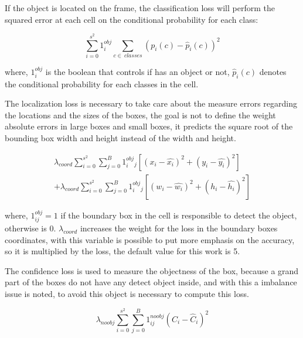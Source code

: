 If the object is located on the frame, the classification loss will perform the squared error at each cell on the conditional probability for each class: 

\begin{equation}
\label{eq:classification_loss}
    \sum_{i=0}^{s^2}1^{obj}_i \sum_{c\in~classes} \left ( p_i\left ( c \right )-\hat{p}_i\left ( c \right )\right )^2
\end{equation}

where, $1^{obj}_i$ is the boolean that controls if has an object or not, $\hat{p}_i\left ( c \right )$ denotes the conditional probability for each classes in the cell.

The localization loss is necessary to take care about the measure errors regarding the locations and the sizes of the boxes, the goal is not to define the weight absolute errors in large boxes and small boxes, it predicts the square root of the bounding box width and height instead of the width and height. 

\begin{equation}
\label{eq:localization_loss}
\begin{aligned}
    \lambda_{coord}\sum_{i=0}^{s^2}\sum_{j=0}^{B}1^{obj}_i_j\left [ \left ( x_i - \hat{x_i} \right )^2  + (y_i-\hat{y_i})^2 \right ] \\ 
    + \lambda_{coord}\sum_{i=0}^{s^2}\sum_{j=0}^{B}1^{obj}_i_j\left [ \left ( w_i - \hat{w_i} \right )^2  + (h_i-\hat{h_i})^2 \right ] 
    \end{aligned}
\end{equation}

where, $1_{ij}^{obj} = 1$ if the boundary box in the cell is responsible to detect the object, otherwise is 0. $\lambda_{coord}$ increases the weight for the loss in the boundary boxes coordinates, with this variable is possible to put more emphasis on the accuracy, so it is multiplied by the loss, the default value for this work is 5. 

The confidence loss is used to measure the objectness of the box, because a grand part of the boxes do not have any detect object inside, and with this a imbalance issue is noted, to avoid this object is necessary to compute this loss. 

\begin{equation}
    \label{eq:confidence_loss}
    \lambda_{noobj}\sum_{i=0}^{s^2}\sum_{j=0}^{B}1^{noobj}_{ij}\left ( C_i - \hat{C}_i \right )^2
\end{equation}

